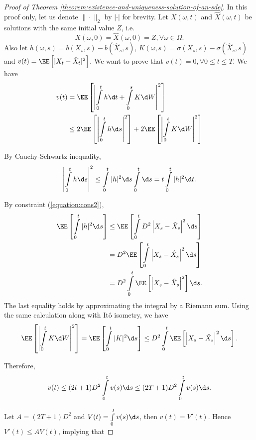 \begin{proof}[Proof of Theorem \ref{theorem:existence-and-uniqueness-solution-of-an-sde}]
  In this proof only, let us denote $\|\cdot\|_2$ by $|\cdot|$ for brevity. Let $X(\omega,t)$ and $\hat{X}(\omega,t)$ be solutions with the same initial value $Z$, i.e.
  $$X(\omega, 0)=\hat{X}(\omega,0)=Z,\forall\omega\in\Omega.$$
  Also let $h(\omega,s)=b(X_s,s)-b(\hat{X}_s,s)$, $K(\omega,s)=\sigma(X_s,s)-\sigma(\hat{X}_s,s)$ and $v(t)=\EE\left[|X_t-\hat{X}_t|^2\right]$. We want to prove that $v(t)=0,\forall 0\le t\le T$. We have
  \begin{align*}
    v(t) & = \EE\left[\left|\int\limits_{0}^th\d t+\int\limits_{0}^s K\d W\right|^2\right]                                    \\
         & \le 2\EE\left[\left|\int\limits_{0}^th\d s\right|^2\right]+2\EE\left[\left|\int\limits_{0}^t K\d W\right|^2\right]
  \end{align*}

  By Cauchy-Schwartz inequality,
  \begin{equation}
    \label{equation:afterCauchy}
    \left|\int\limits_{0}^th\d s\right|^2\le \int\limits_{0}^t|h|^2\d s\int\limits_{0}^t\d s=t\int\limits_{0}^t|h|^2\d t.
  \end{equation}

  By constraint (\ref{equation:cons2}),
  \begin{align*}
    \EE\left[\int\limits_{0}^t|h|^2\d s\right]
     & \le\EE\left[\int\limits_{0}^tD^2\left|X_s-\hat{X}_s\right|^2\d s\right] \\
     & =D^2\EE\left[\int\limits_{0}^t\left|X_s-\hat{X}_s\right|^2\d s\right]   \\
     & =D^2\int\limits_{0}^t\EE\left[\left|X_s-\hat{X}_s\right|^2\right]\d s.
  \end{align*}
  The last equality holds by approximating the integral by a Riemann sum. Using the same calculation along with Itô isometry, we have
  $$\EE\left[\left|\int\limits_{0}^t K\d W\right|^2\right]=\EE\left[\int\limits_{0}^t |K|^2\d s\right]\le D^2\int\limits_{0}^t\EE\left[\left|X_s-\hat{X}_s\right|^2\d s\right].$$

  Therefore,
  \begin{align*}
    v(t)\le  (2t+1)D^2\int\limits_0^t v(s)\d s\le(2T+1)D^2\int\limits_0^t v(s)\d s.
  \end{align*}

  Let $A=(2T+1)D^2$ and $V(t)=\int\limits_0^t v(s)\d s$, then $v(t)=V'(t)$. Hence $V'(t)\le AV(t)$, implying that


\end{proof}
